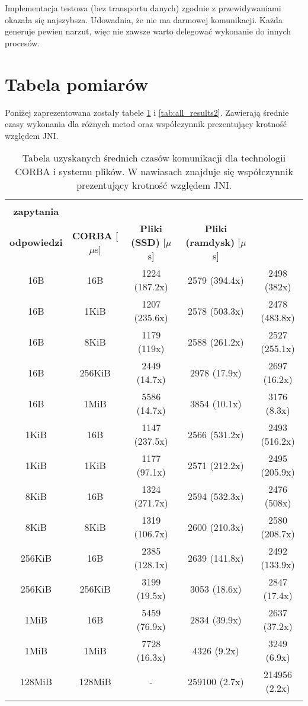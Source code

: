 Implementacja testowa (bez transportu danych) zgodnie z przewidywaniami okazała się najszybsza. Udowadnia, że nie ma darmowej komunikacji. Każda generuje pewien narzut, więc nie zawsze warto delegować wykonanie do innych procesów.


\section{Tabela pomiarów}

Poniżej zaprezentowana zostały tabele \ref{tab:all_results1} i \ref{tab:all_results2}. Zawierają średnie czasy wykonania dla różnych metod oraz współczynnik prezentujący krotność względem JNI.

\begin{longtable}{|c|c|c|c|c|}
    \hline
    \begin{tabular}{@{}c@{}} \textbf{Rozmiar} \\ \textbf{zapytania} \end{tabular} & \begin{tabular}{@{}c@{}} \textbf{Rozmiar} \\ \textbf{odpowiedzi} \end{tabular} & \textbf{CORBA} [$\mu$s] & \textbf{Pliki (SSD)} [$\mu$s] & \textbf{Pliki (ramdysk)} [$\mu$s] \\
    \hline
    16B & 16B & 1224 (187.2x) & 2579 (394.4x) & 2498 (382x) \\
    16B & 1KiB & 1207 (235.6x) & 2578 (503.3x) & 2478 (483.8x) \\
    16B & 8KiB & 1179 (119x) & 2588 (261.2x) & 2527 (255.1x) \\
    16B & 256KiB & 2449 (14.7x) & 2978 (17.9x) & 2697 (16.2x) \\
    16B & 1MiB & 5586 (14.7x) & 3854 (10.1x) & 3176 (8.3x) \\
    1KiB & 16B & 1147 (237.5x) & 2566 (531.2x) & 2493 (516.2x) \\
    1KiB & 1KiB & 1177 (97.1x) & 2571 (212.2x) & 2495 (205.9x) \\
    8KiB & 16B & 1324 (271.7x) & 2594 (532.3x) & 2476 (508x) \\
    8KiB & 8KiB & 1319 (106.7x) & 2600 (210.3x) & 2580 (208.7x) \\
    256KiB & 16B & 2385 (128.1x) & 2639 (141.8x) & 2492 (133.9x) \\
    256KiB & 256KiB & 3199 (19.5x) & 3053 (18.6x) & 2847 (17.4x) \\
    1MiB & 16B & 5459 (76.9x) & 2834 (39.9x) & 2637 (37.2x) \\
    1MiB & 1MiB & 7728 (16.3x) & 4326 (9.2x) & 3249 (6.9x) \\
    128MiB & 128MiB & - & 259100 (2.7x) & 214956 (2.2x) \\
    \hline
    \caption{Tabela uzyskanych średnich czasów komunikacji dla technologii CORBA i systemu plików. W nawiasach znajduje się współczynnik prezentujący krotność względem JNI.}
    \label{tab:all_results1}
\end{longtable}

